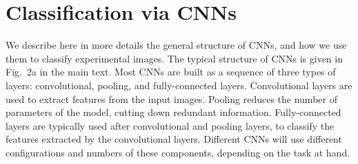 \documentclass[
    floatfix, aps, pra, superscriptaddress,
	10pt, twocolumn,
    nofootinbib,
	tightenlines
]{revtex4-1}
\begin{document}
\section{Classification via CNNs}
\label{sec:CNNs}

We describe here in more details the general structure of CNNs, and how we use them to classify experimental images.
The typical structure of CNNs is given in Fig.~2a in the main text.
Most CNNs are built as a sequence of three types of layers: convolutional, pooling, and fully-connected layers.
Convolutional layers are used to extract features from the input images. Pooling reduces the number of parameters of the model, cutting down redundant information.
Fully-connected layers are typically used after convolutional and pooling layers, to classify the features extracted by the convolutional layers.
Different CNNs will use different configurations and numbers of these components, depending on the task at hand.
\end{document}
